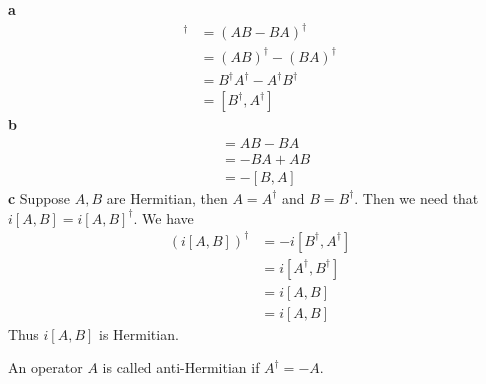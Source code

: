 \documentclass[answers,12pt,addpoints]{exam}
\begin{document}
\begin{questions}
    \begin{solution}
        \textbf{a} 
        \begin{align*}
            [A, B]^\dagger &= (AB - BA)^\dagger \\
            &= (AB)^\dagger - (BA)^\dagger \\
            &= B^\dagger A^\dagger - A^\dagger B^\dagger \\
            &= [B^\dagger, A^\dagger]
        \end{align*}
        \textbf{b}
        \begin{align*}
            [A, B] &= AB - BA \\
            &= -BA + AB \\
            &= -[B, A]
        \end{align*}
        \textbf{c}
        Suppose \(A, B\) are Hermitian, then $A = A^\dagger$ and \(B = B^\dagger\). Then we need that $i[A, B] = i[A, B]^\dagger$. We have
        \begin{align*}
            (i[A, B])^\dagger &= -i[B^\dagger, A^\dagger] \\
            &= i[A^\dagger, B^\dagger] \\
            &= i[A, B] \\
            &= i[A, B]
        \end{align*}
        Thus \(i[A, B]\) is Hermitian.
    \end{solution}
    \question An operator \(A\) is called anti-Hermitian if \(A^\dagger = -A\).
\end{questions}
\end{document}
